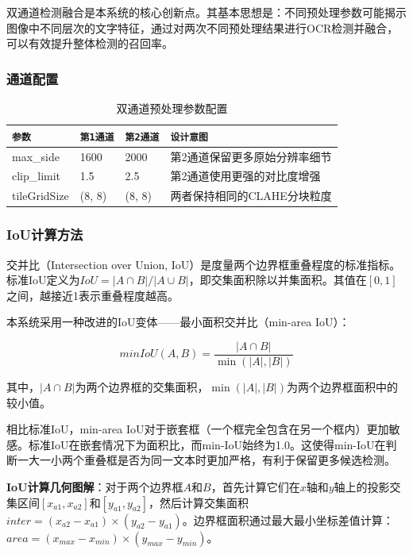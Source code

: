 \documentclass[12pt,hyperref,a4paper,UTF8]{ctexart}
\begin{document}
双通道检测融合是本系统的核心创新点。其基本思想是：不同预处理参数可能揭示图像中不同层次的文字特征，通过对两次不同预处理结果进行OCR检测并融合，可以有效提升整体检测的召回率。

\subsubsection{通道配置}

\begin{table}[!htbp]
    \centering
    \begin{tabular}{l|l|l|l}
        \hline
        \texttt{参数} & \texttt{第1通道} & \texttt{第2通道} & \texttt{设计意图} \\
        \hline
        max\_side & 1600 & 2000 & 第2通道保留更多原始分辨率细节 \\
        clip\_limit & 1.5 & 2.5 & 第2通道使用更强的对比度增强 \\
        tileGridSize & (8, 8) & (8, 8) & 两者保持相同的CLAHE分块粒度 \\
        \hline
    \end{tabular}
    \caption{双通道预处理参数配置}
    \label{tab:dual_channel}
\end{table}

\subsubsection{IoU计算方法}

交并比（Intersection over Union, IoU）是度量两个边界框重叠程度的标准指标。标准IoU定义为$IoU = |A \cap B| / |A \cup B|$，即交集面积除以并集面积。其值在$[0, 1]$之间，越接近1表示重叠程度越高。

本系统采用一种改进的IoU变体——最小面积交并比（min-area IoU）：

\begin{equation}
minIoU(A, B) = \frac{|A \cap B|}{\min(|A|, |B|)}
\end{equation}

其中，$|A \cap B|$为两个边界框的交集面积，$\min(|A|, |B|)$为两个边界框面积中的较小值。

相比标准IoU，min-area IoU对于嵌套框（一个框完全包含在另一个框内）更加敏感。标准IoU在嵌套情况下为面积比，而min-IoU始终为1.0。这使得min-IoU在判断一大一小两个重叠框是否为同一文本时更加严格，有利于保留更多候选检测。

\textbf{IoU计算几何图解}：对于两个边界框$A$和$B$，首先计算它们在$x$轴和$y$轴上的投影交集区间$[x_{a1}, x_{a2}]$和$[y_{a1}, y_{a2}]$，然后计算交集面积$inter = (x_{a2}-x_{a1}) \times (y_{a2}-y_{a1})$。边界框面积通过最大最小坐标差值计算：$area = (x_{max} - x_{min}) \times (y_{max} - y_{min})$。
\end{document}
